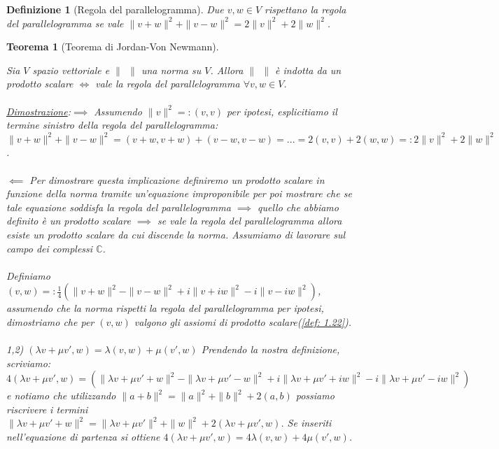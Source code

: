\documentclass[a4paper,12pt]{report}
\newtheorem{teorema}{Teorema}[chapter]
\newtheorem{definizione}{Definizione}[chapter]
\begin{document}
\begin{definizione}[Regola del parallelogramma]\label{def: 2.6}
    Due $v,w \in V$ rispettano la regola del parallelogramma se vale $\|v+w\|^2+\|v-w\|^2=2\|v\|^2+2\|w\|^2$.
\end{definizione}

\begin{teorema}[Teorema di Jordan-Von Newmann]\label{thm: 2.5}
    
    Sia $V$ spazio vettoriale e $\| \ \ \|$ una norma su $V$. Allora $\| \ \ \|$ è indotta da un prodotto scalare $\iff$ vale la regola del parallelogramma $\forall v,w \in V$.
    \\
    \\ \underline{Dimostrazione}:$\boxed{\implies}$ Assumendo $\| v\|^2=:(v,v)$ per ipotesi, esplicitiamo il termine sinistro della regola del parallelogramma:
    \\  $\|v+w\|^2+\|v-w\|^2=(v+w,v+w)+(v-w,v-w)=...=2(v,v)+2(w,w)=:2\|v\|^2+2\|w\|^2$.
    \\
    \\ $\boxed{\impliedby}$ Per dimostrare questa implicazione definiremo un prodotto scalare in funzione della norma tramite un'equazione improponibile per poi mostrare che se tale equazione soddisfa la regola del parallelogramma $\implies$ quello che abbiamo definito è un prodotto scalare $\implies$ se vale la regola del parallelogramma allora esiste un prodotto scalare da cui discende la norma. Assumiamo di lavorare sul campo dei complessi $\mathbb{C}$.
    \\
    \\ Definiamo $(v,w)=:\displaystyle\frac{1}{4}(\|v+w\|^2-\|v-w\|^2+i\|v+iw\|^2-i\|v-iw\|^2)$, assumendo che la norma rispetti la regola del parallelogramma per ipotesi, dimostriamo che per $(v,w)$ valgono gli assiomi di prodotto scalare(\ref{def: 1.22}). 
    \\
    \\ 1,2) $\boxed{(\lambda v+\mu v',w)=\lambda(v,w)+\mu(v',w)}$ Prendendo la nostra definizione, scriviamo:
    \\ \mbox{$4(\lambda v + \mu v',w)=(\|\lambda v+\mu v' +w\|^2-\|\lambda v +\mu v'-w\|^2+i\|\lambda v+\mu v'+iw\|^2-i\|\lambda v+\mu v'-iw\|^2)$}
    e notiamo che utilizzando $\|a+b\|^2=\|a\|^2+\|b\|^2+2(a,b) $ possiamo riscrivere i termini $ \|\lambda v+\mu v'+w\|^2=\|\lambda v+\mu v'\|^2+\|w\|^2+2(\lambda v+\mu v', w)$. Se inseriti nell'equazione di partenza si ottiene $4(\lambda v+ \mu v', w)=4\lambda (v,w)+4\mu(v',w)$.
    \\

\end{teorema}
\end{document}
